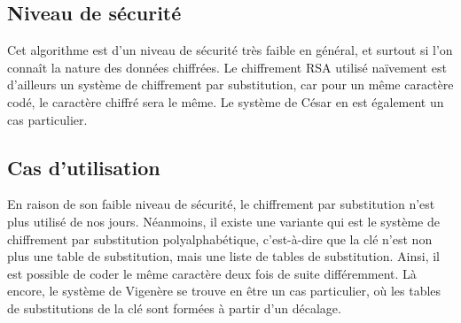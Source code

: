 		\subsection{Niveau de sécurité}
			Cet algorithme est d'un niveau de sécurité très faible en général, et surtout si l'on connaît la nature des données chiffrées. Le chiffrement RSA utilisé naïvement est d'ailleurs un système de chiffrement par substitution, car pour un même caractère codé, le caractère chiffré sera le même. Le système de César en est également un cas particulier.
		\subsection{Cas d'utilisation}
			En raison de son faible niveau de sécurité, le chiffrement par substitution n'est plus utilisé de nos jours. Néanmoins, il existe une variante qui est le système de chiffrement par substitution polyalphabétique, c'est-à-dire que la clé n'est non plus une table de substitution, mais une liste de tables de substitution. Ainsi, il est possible de coder le même caractère deux fois de suite différemment. Là encore, le système de Vigenère se trouve en être un cas particulier, où les tables de substitutions de la clé sont formées à partir d'un décalage.